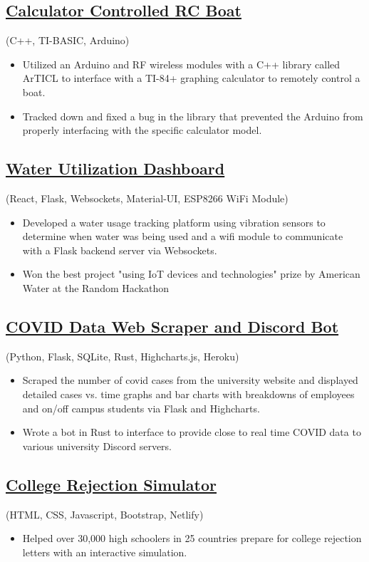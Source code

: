 \documentclass{article}
\begin{document}
\subsection{\href{https://youtu.be/DLzxrzFCyOs}{\underline{Calculator Controlled RC Boat}}} \hfill (C++, TI-BASIC, Arduino)
\begin{itemize}
    \item Utilized an Arduino and RF wireless modules with a C++ library called ArTICL to interface with a TI-84+ graphing calculator to remotely control a boat.
    \item Tracked down and fixed a bug in the library that prevented the Arduino from properly interfacing with the specific calculator model.
\end{itemize}

\subsection{\href{https://youtu.be/DLzxrzFCyOs}{\underline{Water Utilization Dashboard}}} \hfill (React, Flask, Websockets, Material-UI, ESP8266 WiFi Module)
\begin{itemize}
    \item Developed a water usage tracking platform using vibration sensors to determine when water was being used and a wifi module to communicate with a Flask backend server via Websockets. 
    \item Won the best project "using IoT devices and technologies" prize by American Water at the Random Hackathon
\end{itemize}

\subsection{\href{https://youtu.be/DLzxrzFCyOs}{\underline{COVID Data Web Scraper and Discord Bot}}} \hfill (Python, Flask, SQLite, Rust, Highcharts.js, Heroku)
\begin{itemize}
    \item Scraped the number of covid cases from the university website and displayed detailed cases vs. time graphs and bar charts with breakdowns of employees and on/off campus students via Flask and Highcharts.
    \item Wrote a bot in Rust to interface to provide close to real time COVID data to various university Discord servers.
\end{itemize}

\subsection{\href{https://youtu.be/DLzxrzFCyOs}{\underline{College Rejection Simulator}}} \hfill (HTML, CSS, Javascript, Bootstrap, Netlify)
\begin{itemize}
    \item Helped over 30,000 high schoolers in 25 countries prepare for college rejection letters with an interactive simulation.
\end{itemize}
\end{document}
